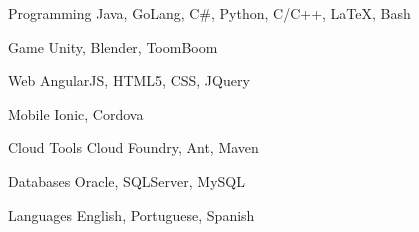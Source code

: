 

\begin{cvskills}

  \cvskill
    {Programming} %
    {Java, GoLang, C\#, Python, C/C++, LaTeX, Bash} %

  \cvskill
    {Game} %
    {Unity, Blender, ToomBoom} %

  \cvskill
    {Web} %
    {AngularJS, HTML5, CSS, JQuery} %

  \cvskill
    {Mobile} %
    {Ionic, Cordova} %
    
  \cvskill
    {Cloud Tools} %
    {Cloud Foundry, Ant, Maven} %

  \cvskill
    {Databases} %
    {Oracle, SQLServer, MySQL} %
        
  \cvskill
    {Languages} %
    {English, Portuguese, Spanish} %
    

\end{cvskills}
